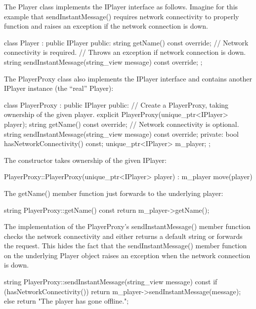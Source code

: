 The Player class implements the IPlayer interface as follows. Imagine for this example that sendInstantMessage() requires network connectivity to properly function and raises an exception if the network connection is down.

\begin{cpp}
class Player : public IPlayer
{
    public:
        string getName() const override;
        // Network connectivity is required.
        // Throws an exception if network connection is down.
        string sendInstantMessage(string_view message) const override;
};
\end{cpp}

The PlayerProxy class also implements the IPlayer interface and contains another IPlayer instance (the “real” Player):

\begin{cpp}
class PlayerProxy : public IPlayer
{
    public:
        // Create a PlayerProxy, taking ownership of the given player.
        explicit PlayerProxy(unique_ptr<IPlayer> player);
        string getName() const override;
        // Network connectivity is optional.
        string sendInstantMessage(string_view message) const override;
    private:
        bool hasNetworkConnectivity() const;
        unique_ptr<IPlayer> m_player;
};
\end{cpp}

The constructor takes ownership of the given IPlayer:

\begin{cpp}
PlayerProxy::PlayerProxy(unique_ptr<IPlayer> player)
    : m_player { move(player) } { }
\end{cpp}

The getName() member function just forwards to the underlying player:

\begin{cpp}
string PlayerProxy::getName() const { return m_player->getName(); }
\end{cpp}

The implementation of the PlayerProxy’s sendInstantMessage() member function checks the network connectivity and either returns a default string or forwards the request. This hides the fact that the sendInstantMessage() member function on the underlying Player object raises an exception when the network connection is down.

\begin{cpp}
string PlayerProxy::sendInstantMessage(string_view message) const
{
    if (hasNetworkConnectivity()) { return m_player->sendInstantMessage(message); }
    else { return "The player has gone offline."; }
}
\end{cpp}

